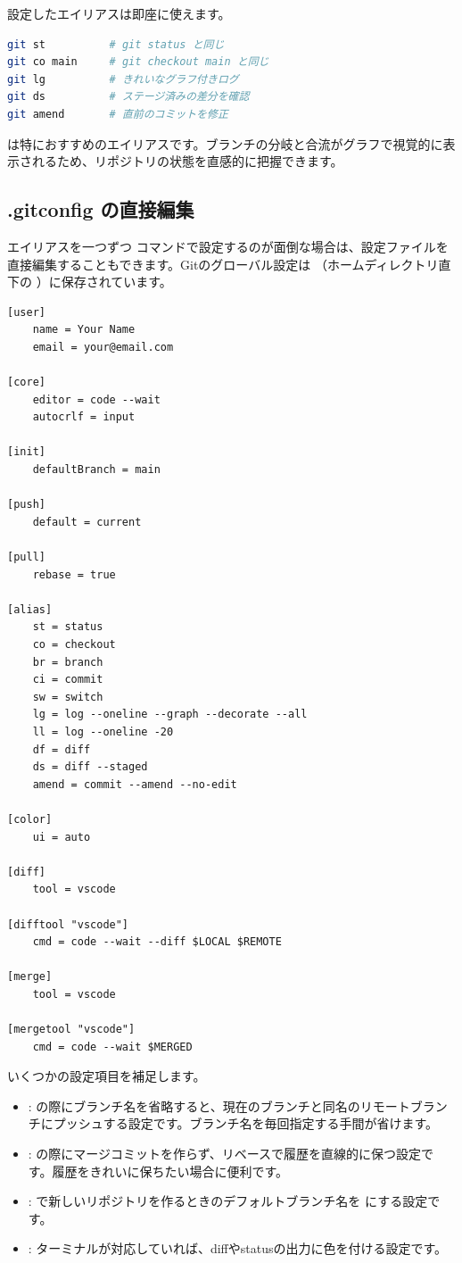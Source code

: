 設定したエイリアスは即座に使えます。

\begin{lstlisting}[language=bash]
git st          # git status と同じ
git co main     # git checkout main と同じ
git lg          # きれいなグラフ付きログ
git ds          # ステージ済みの差分を確認
git amend       # 直前のコミットを修正
\end{lstlisting}

 は特におすすめのエイリアスです。ブランチの分岐と合流がグラフで視覚的に表示されるため、リポジトリの状態を直感的に把握できます。

\subsection{.gitconfig の直接編集}

エイリアスを一つずつ  コマンドで設定するのが面倒な場合は、設定ファイルを直接編集することもできます。Gitのグローバル設定は （ホームディレクトリ直下の ）に保存されています。

\begin{lstlisting}[language={}]
[user]
    name = Your Name
    email = your@email.com

[core]
    editor = code --wait
    autocrlf = input

[init]
    defaultBranch = main

[push]
    default = current

[pull]
    rebase = true

[alias]
    st = status
    co = checkout
    br = branch
    ci = commit
    sw = switch
    lg = log --oneline --graph --decorate --all
    ll = log --oneline -20
    df = diff
    ds = diff --staged
    amend = commit --amend --no-edit

[color]
    ui = auto

[diff]
    tool = vscode

[difftool "vscode"]
    cmd = code --wait --diff $LOCAL $REMOTE

[merge]
    tool = vscode

[mergetool "vscode"]
    cmd = code --wait $MERGED
\end{lstlisting}

いくつかの設定項目を補足します。

\begin{itemize}
  \item \textbf{}:  の際にブランチ名を省略すると、現在のブランチと同名のリモートブランチにプッシュする設定です。ブランチ名を毎回指定する手間が省けます。
  \item \textbf{}:  の際にマージコミットを作らず、リベースで履歴を直線的に保つ設定です。履歴をきれいに保ちたい場合に便利です。
  \item \textbf{}:  で新しいリポジトリを作るときのデフォルトブランチ名を  にする設定です。
  \item \textbf{}: ターミナルが対応していれば、diffやstatusの出力に色を付ける設定です。
\end{itemize}

